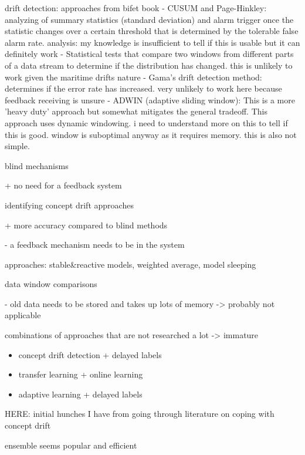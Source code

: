 drift detection:
approaches from bifet book
- CUSUM and Page-Hinkley: analyzing of summary statistics (standard deviation) and alarm trigger once the statistic changes over a certain threshold that is determined by the tolerable false alarm rate. analysis: my knowledge is insufficient to tell if this is usable but it can definitely work
- Statistical tests that compare two windows from different parts of a data stream to determine if the distribution has changed. this is unlikely to work given the maritime drifts nature
- Gama's drift detection method: determines if the error rate has increased. very unlikely to work here because feedback receiving is unsure
- ADWIN (adaptive sliding window): This is a more 'heavy duty' approach but somewhat mitigates the general tradeoff. This approach uses dynamic windowing. i need to understand more on this to tell if this is good. window is suboptimal anyway as it requires memory. this is also not simple.

blind mechanisms

+ no need for a feedback system

identifying concept drift approaches

+ more accuracy compared to blind methods \cite{conceptdriftsurvey}

- a feedback mechanism needs to be in the system





approaches: stable&reactive models, weighted average, model sleeping \cite{conceptdriftsurvey}

data window comparisons

- old data needs to be stored and takes up lots of memory \cite{conceptdriftsurvey} -> probably not applicable

combinations of approaches that are not researched a lot -> immature

\begin{itemize}
    \item concept drift detection + delayed labels \cite{mlforstreamingsurvey}
    \item transfer learning + online learning \cite{mlforstreamingsurvey}
    \item adaptive learning + delayed labels \cite{mlforstreamingsurvey}
\end{itemize}

HERE: initial hunches I have from going through literature on coping with concept drift

ensemble seems popular and efficient

